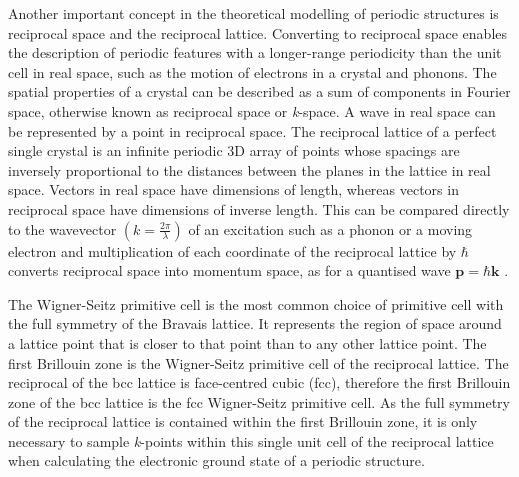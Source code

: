 \documentclass[11pt, twoside]{report}
\begin{document}
Another important concept in the theoretical modelling of periodic structures is reciprocal space and the reciprocal lattice. 
Converting to reciprocal space enables the description of periodic features with a longer-range periodicity than the unit cell in real space, such as the motion of electrons in a crystal and phonons.
The spatial properties of a crystal can be described as a sum of components in Fourier space, otherwise known as reciprocal space or \textit{k}-space. A wave in real space can be represented by a point in reciprocal space. The reciprocal lattice of a perfect single crystal is an infinite periodic 3D array of points whose spacings are inversely proportional to the distances between the planes in the lattice in real space. Vectors in real space have dimensions of length, whereas vectors in reciprocal space have dimensions of inverse length. This can be compared directly to the wavevector $ \left(k  = \frac{2\pi}{\lambda} \right)$ of an excitation such as a phonon or a moving electron and multiplication of each coordinate of the reciprocal lattice by $\hbar$ converts reciprocal space into momentum space, as for a quantised wave $\boldsymbol{p} = \hbar \boldsymbol{k}$ \cite{Blakemore1}. 


The Wigner-Seitz primitive cell is the most common choice of primitive cell with the full symmetry of the Bravais lattice. It represents the region of space around a lattice point  that is closer to that point than to any other lattice point. 
The first Brillouin zone is the Wigner-Seitz primitive cell of the reciprocal lattice. The reciprocal of the bcc lattice is face-centred cubic (fcc), therefore the first Brillouin zone of the bcc lattice is the fcc Wigner-Seitz primitive cell. 
As the full symmetry of the reciprocal lattice is contained within the first Brillouin zone, it is only necessary to sample \textit{k}-points within this single unit cell of the reciprocal lattice when calculating the electronic ground state of a periodic structure.
\end{document}
